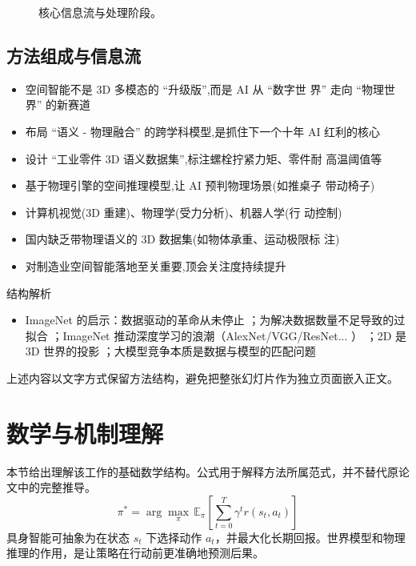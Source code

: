 \documentclass[UTF8,11pt,a4paper]{ctexart}
\begin{document}
\begin{figure}[H]
\centering
{}
\caption{核心信息流与处理阶段。}
\end{figure}

\subsection{方法组成与信息流}
\begin{itemize}
\item 空间智能不是 3D 多模态的 “升级版”,而是 AI 从 “数字世 界” 走向 “物理世界” 的新赛道
\item 布局 “语义 - 物理融合” 的跨学科模型,是抓住下一个十年 AI 红利的核心
\item 设计 “工业零件 3D 语义数据集”,标注螺栓拧紧力矩、零件耐 高温阈值等
\item 基于物理引擎的空间推理模型,让 AI 预判物理场景(如推桌子 带动椅子)
\item 计算机视觉(3D 重建)、物理学(受力分析)、机器人学(行 动控制)
\item 国内缺乏带物理语义的 3D 数据集(如物体承重、运动极限标 注)
\item 对制造业空间智能落地至关重要,顶会关注度持续提升
\end{itemize}

\begin{keybox}{结构解析}
\begin{itemize}
\item ImageNet 的启示：数据驱动的革命从未停止 ；为解决数据数量不足导致的过拟合 ；ImageNet 推动深度学习的浪潮（AlexNet/VGG/ResNet... ） ；2D 是 3D 世界的投影 ；大模型竞争本质是数据与模型的匹配问题
\end{itemize}
\end{keybox}

上述内容以文字方式保留方法结构，避免把整张幻灯片作为独立页面嵌入正文。

\section{数学与机制理解}
本节给出理解该工作的基础数学结构。公式用于解释方法所属范式，并不替代原论文中的完整推导。
\begin{equation}
\pi^*=\arg\max_\pi\,\mathbb{E}_\pi\!\left[\sum_{t=0}^{T}\gamma^t r(s_t,a_t)\right]
\end{equation}
具身智能可抽象为在状态 $s_t$ 下选择动作 $a_t$，并最大化长期回报。世界模型和物理推理的作用，是让策略在行动前更准确地预测后果。
\end{document}
